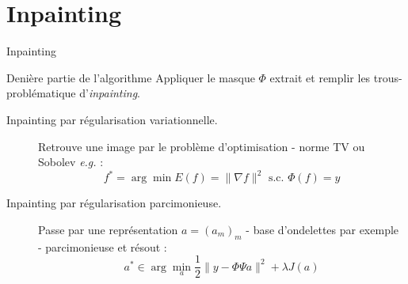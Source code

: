\section{Inpainting}

\begin{frame}{Inpainting}
\begin{block}{Denière partie de l'algorithme}
Appliquer le masque $\Phi$ extrait et remplir les \og trous\fg - problématique d'\emph{inpainting}.
\end{block}
\begin{description}
\item[Inpainting par régularisation variationnelle. ]Retrouve une image par le problème d'optimisation - norme TV ou Sobolev \emph{e.g.} :
\begin{equation}
f^* = \arg \min E(f) = \|\nabla f \|^2 \text{ s.c. } \Phi(f) = y
\end{equation}

\item[Inpainting par régularisation parcimonieuse. ]Passe par une représentation $a = (a_m)_m$ - base d'ondelettes par exemple - parcimonieuse et résout : 
\begin{equation}
a^* \in \arg \min_a \frac{1}{2} \| y - \Phi \Psi a \|^2 + \lambda J(a)
\end{equation}
\end{description}
\end{frame}


